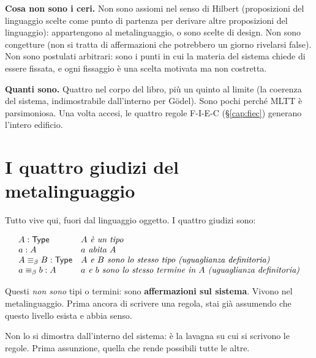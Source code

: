 \bigskip

\noindent\textbf{Cosa non sono i ceri.} Non sono assiomi nel senso di Hilbert (proposizioni del linguaggio scelte come punto di partenza per derivare altre proposizioni del linguaggio): appartengono al metalinguaggio, o sono scelte di design. Non sono congetture (non si tratta di affermazioni che potrebbero un giorno rivelarsi false). Non sono postulati arbitrari: sono i punti in cui la materia del sistema chiede di essere fissata, e ogni fissaggio \`e una scelta motivata ma non costretta.

\bigskip

\noindent\textbf{Quanti sono.} Quattro nel corpo del libro, pi\`u un quinto al limite (la coerenza del sistema, indimostrabile dall'interno per Gödel). Sono pochi perch\'e MLTT \`e parsimoniosa. Una volta accesi, le quattro regole F-I-E-C (\S\ref{cap:fiec}) generano l'intero edificio.

\chapter{I quattro giudizi del metalinguaggio}\label{cap:giudizi}

Tutto vive qui, fuori dal linguaggio oggetto. I quattro giudizi sono:

\begin{equation*}
\begin{array}{ll}
A : \mathsf{Type} & \text{\textit{$A$ \`e un tipo}} \\
a : A & \text{\textit{$a$ abita $A$}} \\
A \equiv_{\beta} B : \mathsf{Type} & \text{\textit{$A$ e $B$ sono lo stesso tipo (uguaglianza definitoria)}} \\
a \equiv_{\beta} b : A & \text{\textit{$a$ e $b$ sono lo stesso termine in $A$ (uguaglianza definitoria)}}
\end{array}
\end{equation*}

Questi \emph{non sono} tipi o termini: sono \textbf{affermazioni sul sistema}. Vivono nel metalinguaggio. Prima ancora di scrivere una regola, stai gi\`a assumendo che questo livello esista e abbia senso.

\begin{cero}
Non lo si dimostra dall'interno del sistema: \`e la lavagna su cui si scrivono le regole. Prima assunzione, quella che rende possibili tutte le altre.
\end{cero}

